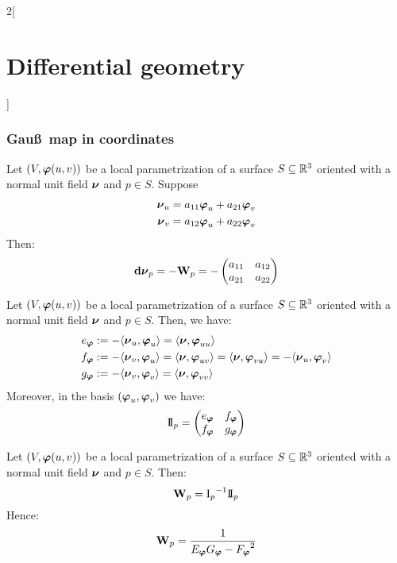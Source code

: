 \documentclass[../../../main.tex]{subfiles}
\begin{document}
\begin{multicols}{2}[\section{Differential geometry}]
  \subsubsection{Gau\ss\ map in coordinates}
  \begin{proposition}
    Let $(V,\boldsymbol{\mathrm{\varphi}}(u,v))$ be a local pa\-ram\-e\-triza\-tion of a surface $S\subseteq\mathbb{R}^3$ oriented with a normal unit field $\boldsymbol{\mathrm{\nu}}$ and $p\in S$.
    Suppose
    \begin{align*}
      \boldsymbol{\mathrm{\nu}}_u & =a_{11}\boldsymbol{\mathrm{\varphi}}_u+a_{21}\boldsymbol{\mathrm{\varphi}}_v \\
      \boldsymbol{\mathrm{\nu}}_v & =a_{12}\boldsymbol{\mathrm{\varphi}}_u+a_{22}\boldsymbol{\mathrm{\varphi}}_v
    \end{align*}
    Then: $$\boldsymbol{\mathrm{\dd{\nu}}}_p=-\boldsymbol{\mathrm{W}}_p=-
      \begin{pmatrix}
        a_{11} & a_{12} \\
        a_{21} & a_{22}
      \end{pmatrix}$$
  \end{proposition}
  \begin{proposition}
    Let $(V,\boldsymbol{\mathrm{\varphi}}(u,v))$ be a local pa\-ram\-e\-triza\-tion of a surface $S\subseteq\mathbb{R}^3$ oriented with a normal unit field $\boldsymbol{\mathrm{\nu}}$ and $p\in S$. Then, we have:
    \begin{align*}
      e_{\boldsymbol{\mathrm{\varphi}}} & :=-\langle\boldsymbol{\mathrm{\nu}}_u,\boldsymbol{\mathrm{\varphi}}_u\rangle=\langle \boldsymbol{\mathrm{\nu}},\boldsymbol{\mathrm{\varphi}}_{uu}\rangle                                                                            \\
      f_{\boldsymbol{\mathrm{\varphi}}} & :=-\langle\boldsymbol{\mathrm{\nu}}_v,\boldsymbol{\mathrm{\varphi}}_u\rangle=\langle \boldsymbol{\mathrm{\nu}},\boldsymbol{\mathrm{\varphi}}_{uv}\rangle=\langle \boldsymbol{\mathrm{\nu}},\boldsymbol{\mathrm{\varphi}}_{vu}\rangle=-\langle\boldsymbol{\mathrm{\nu}}_u,\boldsymbol{\mathrm{\varphi}}_v\rangle \\
      g_{\boldsymbol{\mathrm{\varphi}}} & :=-\langle\boldsymbol{\mathrm{\nu}}_v,\boldsymbol{\mathrm{\varphi}}_v\rangle=\langle \boldsymbol{\mathrm{\nu}},\boldsymbol{\mathrm{\varphi}}_{vv}\rangle
    \end{align*}
    Moreover, in the basis $(\boldsymbol{\mathrm{\varphi}}_u,\boldsymbol{\mathrm{\varphi}}_v)$ we have:
    $$
      \mathrm{I\!I}_p=\begin{pmatrix}
        e_{\boldsymbol{\mathrm{\varphi}}} & f_{\boldsymbol{\mathrm{\varphi}}} \\
        f_{\boldsymbol{\mathrm{\varphi}}} & g_{\boldsymbol{\mathrm{\varphi}}}
      \end{pmatrix}
    $$
  \end{proposition}
  \begin{proposition}
    Let $(V,\boldsymbol{\mathrm{\varphi}}(u,v))$ be a local pa\-ram\-e\-triza\-tion of a surface $S\subseteq\mathbb{R}^3$ oriented with a normal unit field $\boldsymbol{\mathrm{\nu}}$ and $p\in S$. Then:
    $$\boldsymbol{\mathrm{W}}_p={\mathrm{I}_p}^{-1}\mathrm{I\!I}_p$$
    Hence: $$\boldsymbol{\mathrm{W}}_p=\frac{1}{E_{\boldsymbol{\mathrm{\varphi}}}G_{\boldsymbol{\mathrm{\varphi}}}-{F_{\boldsymbol{\mathrm{\varphi}}}}^2}
$$
\end{proposition}
\end{multicols}
\end{document}
